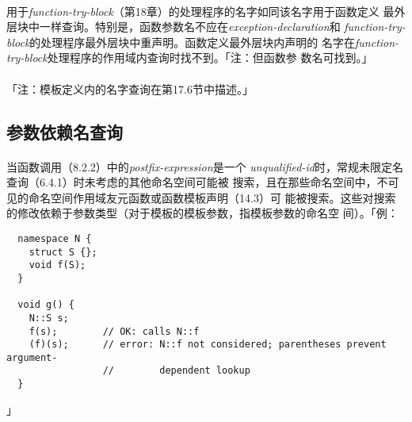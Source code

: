 \paragraph{}
用于\textit{function-try-block}（第18章）的处理程序的名字如同该名字用于函数定义
最外层块中一样查询。特别是，函数参数名不应在\textit{exception-declaration}和
\textit{function-try-block}的处理程序最外层块中重声明。函数定义最外层块内声明的
名字在\textit{function-try-block}处理程序的作用域内查询时找不到。「注：但函数参
数名可找到。」

\paragraph{}
「注：模板定义内的名字查询在第17.6节中描述。」

\subsection{参数依赖名查询}
\paragraph{}
当函数调用（8.2.2）中的\textit{postfix-expression}是一个
\textit{unqualified-id}时，常规未限定名查询（6.4.1）时未考虑的其他命名空间可能被
搜索，且在那些命名空间中，不可见的命名空间作用域友元函数或函数模板声明（14.3）可
能被搜索。这些对搜索的修改依赖于参数类型（对于模板的模板参数，指模板参数的命名空
间）。「例：
\begin{lstlisting}
  namespace N {
    struct S {};
    void f(S);
  }

  void g() {
    N::S s;
    f(s);        // OK: calls N::f
    (f)(s);      // error: N::f not considered; parentheses prevent argument-
                 //        dependent lookup
  }
\end{lstlisting}」

